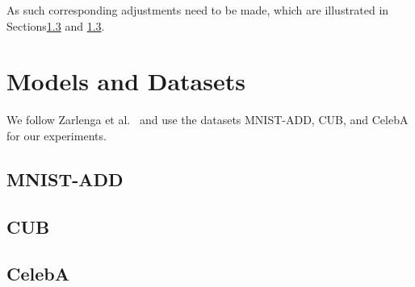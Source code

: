 \documentclass[../main.tex]{subfiles}
\begin{document}
As such corresponding adjustments need to be made, which are illustrated in Sections\ref{} and \ref{}.


\section{Models and Datasets}
We follow Zarlenga et al.~\cite{intcem} and use the datasets MNIST-ADD, CUB, and CelebA for 
our experiments.

\subsection{MNIST-ADD}

\subsection{CUB}

\subsection{CelebA}
\end{document}

